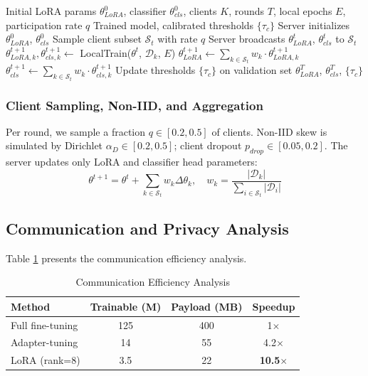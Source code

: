 \documentclass[10pt,journal,compsoc]{IEEEtran}
\begin{document}
\begin{algorithm}[!t]
\caption{FarmFederate-Advisor with FedAvg}
\label{alg:fedavg}
\begin{algorithmic}[1]
\REQUIRE Initial LoRA params $\theta^0_{LoRA}$, classifier $\theta^0_{cls}$, clients $K$, rounds $T$, local epochs $E$, participation rate $q$
\ENSURE Trained model, calibrated thresholds $\{\tau_c\}$
\STATE Server initializes $\theta^0_{LoRA}$, $\theta^0_{cls}$
    \STATE Sample client subset $\mathcal{S}_t$ with rate $q$
    \STATE Server broadcasts $\theta^t_{LoRA}$, $\theta^t_{cls}$ to $\mathcal{S}_t$
        \STATE $\theta^{t+1}_{LoRA,k}, \theta^{t+1}_{cls,k} \leftarrow$ LocalTrain($\theta^t$, $\mathcal{D}_k$, $E$)
    \ENDFOR
    \STATE $\theta^{t+1}_{LoRA} \leftarrow \sum_{k \in \mathcal{S}_t} w_k \cdot \theta^{t+1}_{LoRA,k}$
    \STATE $\theta^{t+1}_{cls} \leftarrow \sum_{k \in \mathcal{S}_t} w_k \cdot \theta^{t+1}_{cls,k}$
    \STATE Update thresholds $\{\tau_c\}$ on validation set
\ENDFOR
\RETURN $\theta^T_{LoRA}$, $\theta^T_{cls}$, $\{\tau_c\}$
\end{algorithmic}
\end{algorithm}

\subsubsection{Client Sampling, Non-IID, and Aggregation}

Per round, we sample a fraction $q \in [0.2, 0.5]$ of clients. Non-IID skew is simulated by Dirichlet $\alpha_D \in [0.2, 0.5]$; client dropout $p_{drop} \in [0.05, 0.2]$. The server updates only LoRA and classifier head parameters:
\begin{equation}
    \theta^{t+1} = \theta^t + \sum_{k \in \mathcal{S}_t} w_k \Delta\theta_k, \quad w_k = \frac{|\mathcal{D}_k|}{\sum_{i \in \mathcal{S}_t} |\mathcal{D}_i|}
\end{equation}

\subsection{Communication and Privacy Analysis}

Table \ref{tab:communication} presents the communication efficiency analysis.

\begin{table}[!t]
\centering
\caption{Communication Efficiency Analysis}
\label{tab:communication}
\small
\begin{tabular}{lccc}
\toprule
\textbf{Method} & \textbf{Trainable (M)} & \textbf{Payload (MB)} & \textbf{Speedup} \\
\midrule
Full fine-tuning & 125 & 400 & 1$\times$ \\
Adapter-tuning & 14 & 55 & 4.2$\times$ \\
\rowcolor{lightgreen} LoRA (rank=8) & 3.5 & 22 & \textbf{10.5$\times$} \\
\bottomrule
\end{tabular}
\end{table}
\end{document}
